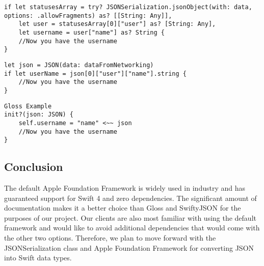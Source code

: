\documentclass[onecolumn, draftclsnofoot,10pt, compsoc]{IEEEtran}
\begin{document}
\begin{lstlisting}
if let statusesArray = try? JSONSerialization.jsonObject(with: data, options: .allowFragments) as? [[String: Any]],
    let user = statusesArray[0]["user"] as? [String: Any],
    let username = user["name"] as? String {
    //Now you have the username
}
\end{lstlisting}

\begin{lstlisting}
let json = JSON(data: dataFromNetworking)
if let userName = json[0]["user"]["name"].string {
    //Now you have the username
}
\end{lstlisting}

\begin{lstlisting}
Gloss Example
init?(json: JSON) {
    self.username = "name" <~~ json
    //Now you have the username
}
\end{lstlisting}

\subsection{Conclusion}
The default Apple Foundation Framework is widely used in industry and has guaranteed support for Swift 4 and zero dependencies. 
The significant amount of documentation makes it a better choice than Gloss and SwiftyJSON for the purposes of our project. 
Our clients are also most familiar with using the default framework and would like to avoid additional dependencies that would come with the other two options. 
Therefore, we plan to move forward with the JSONSerialization class and Apple Foundation Framework for converting JSON into Swift data types.



\end{document}
